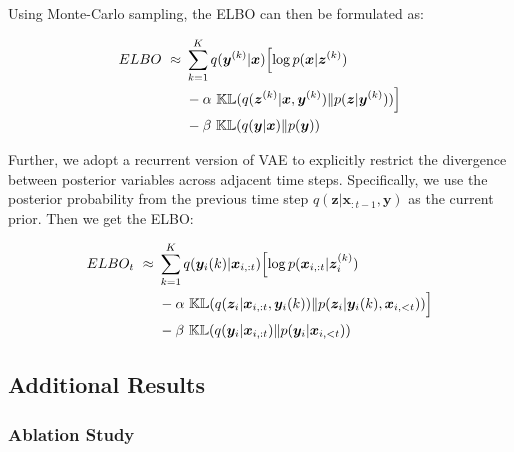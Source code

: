\documentclass[letterpaper]{article} %
\begin{document}
Using Monte-Carlo sampling, the ELBO can then be formulated as:

\begin{equation}
\begin{aligned}
ELBO \ \approx \  &\sum_{k=1}^{K} q(\bm y^{(k)}|\bm x) \Bigl[\log p(\bm x|\bm z^{(k)}) \\ & -\alpha\ \mathbb{KL}(q(\bm z^{(k)}|\bm x, \bm y^{(k)})\| p(\bm z|\bm y^{(k)}))\Bigr] \\
&-\beta\ \mathbb{KL}(q(\bm y|\bm x)\|p(\bm y))
\end{aligned}
\end{equation}


Further, we adopt a recurrent version of VAE \cite{VRNN} to explicitly restrict the divergence between posterior variables across adjacent time steps. Specifically, we use the posterior probability from the previous time step $q(\bm z|\bm x_{:t-1}, \bm y)$ as the current prior. Then we get the ELBO:

\begin{equation}
\label{con:ELBO-GMVAE-SEQ}
\begin{aligned}
ELBO_{t}\ \approx\  &\sum_{k=1}^{K} q(\bm y_{i}(k)|\bm x_{i, :t}) \Bigl[\log p(\bm x_{i, :t}|\bm z_{i}^{(k)})  \\ &-\alpha\ \mathbb{KL}(q(\bm z_{i}|\bm x_{i, :t}, \bm y_{i}(k))\|p(\bm z_{i}|\bm y_{i}(k),  \bm x_{i, <t}))\Bigr] \\
&-\beta\ \mathbb{KL}(q(\bm y_{i}|\bm x_{i,:t})\|p(\bm y_{i}|\bm x_{i,<t}))
\end{aligned}
\end{equation}



\subsection{Additional Results}

\subsubsection{Ablation Study}
\label{sec:ablation-study}
\end{document}

